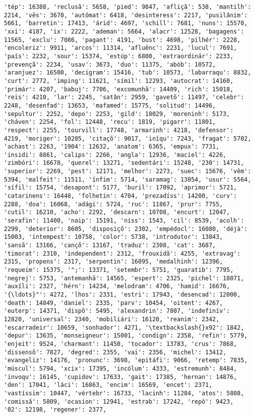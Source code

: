 \documentclass[11pt]{article}
\begin{document}
\begin{Verbatim}[commandchars=\\\{\}]
'tép': 16388, 'reclusã': 5658, 'pied': 9847, 'afliçã': 538, 'mantilh': 2214, 'vês': 3670, 'autômat': 6418, 'desinteress': 2217, 'pusilânim': 5661, 'barretin': 17413, 'árid': 4697, 'schill': 7681, 'nuns': 15570, 'xxi': 4187, 'ix': 2222, 'ademan': 5664, 'alacr': 12528, 'bagagens': 11565, 'exclu': 7086, 'pagant': 4191, 'bust': 4698, 'pilhér': 2228, 'encoleriz': 9911, 'arcos': 11314, 'afluênc': 2231, 'lucul': 7691, 'país': 2232, 'sour': 15374, 'estúp': 6800, 'extraordinár': 2233, 'prevençã': 2234, 'usav': 3673, 'duo': 11375, 'abób': 10572, 'aranjuez': 16500, 'decigram': 15416, 'tub': 10573, 'labarraqu': 8832, 'curt': 2772, 'imping': 11621, 'símil': 12293, 'autocrat': 14160, 'primár': 4207, 'babuj': 7706, 'excomunhã': 14409, 'rich': 15018, 'reis': 4210, 'lar': 2245, 'satân': 2959, 'gavetõ': 11497, 'celebr': 2248, 'desenfad': 13653, 'mafamed': 15775, 'solitud': 14496, 'sepultur': 2252, 'depo': 2253, 'gild': 18029, 'moreninh': 5173, 'cháven': 2254, 'fol': 12448, 'recu': 1819, 'pigarr': 11801, 'respect': 2255, 'tourvill': 17748, 'armarinh': 4218, 'defensor': 4219, 'moriger': 10205, 'citaçõ': 9017, 'iníqu': 7243, 'fragat': 5702, 'achast': 2263, '1904': 12632, 'anatom': 6365, 'empux': 7731, 'insidi': 8861, 'calips': 2266, 'angla': 12936, 'maciel': 4226, 'zimbóri': 16678, 'querel': 13271, 'sedentári': 15248, '230': 14731, 'superior': 2269, 'pest': 12171, 'melhor': 2273, 'suec': 15676, 'vêm': 5394, 'malfeit': 11511, 'ínfim': 5714, 'saramag': 13054, 'usur': 5564, 'sífil': 15754, 'desapont': 5177, 'buril': 17092, 'aprimor': 5721, 'catarinens': 16448, 'folhetin': 4704, 'prezadíss': 14200, 'curv': 2288, 'doa': 16068, 'adági': 5724, 'ruc': 11867, 'prur': 7755, 'cutil': 16210, 'acho': 2292, 'descarn': 10708, 'encurt': 12047, 'serafin': 11400, 'naip': 15191, 'niss': 1543, 'cil': 8539, 'acolh': 2299, 'deterior': 8605, 'disposiçõ': 2302, 'empédocl': 16080, 'déjà': 15003, 'intempest': 10758, 'color': 5738, 'introdutor': 13843, 'sansã': 13166, 'cançõ': 13167, 'traduz': 2308, 'cat': 3687, 'timorat': 2310, 'independent': 2312, 'frouxidã': 4255, 'extravag': 2315, 'propens': 2317, 'serpentin': 16095, 'medalhinh': 12396, 'requeim': 15375, '";': 13371, 'setembr': 5751, 'guaratib': 7795, 'negrej': 5753, 'antemanhã': 14565, 'espert': 2325, 'pichel': 18071, 'auxíli': 2327, 'hérn': 14234, 'melodram': 4706, 'hamid': 16676, '{\ldots}"': 4272, 'lhos': 2331, 'estri': 17943, 'desencad': 12000, 'death': 14849, 'daniel': 2335, 'parv': 10454, 'oitent': 4267, 'euterp': 14371, 'dispõ': 5495, 'alexandrin': 7807, 'indefinív': 12820, 'universal': 2340, 'mobiliári': 16120, 'reanim': 2342, 'escarradeir': 10659, 'sonhador': 4271, '\textbackslash{}x92': 1842, 'depur': 13635, 'monseigneur': 15001, 'condign': 2358, 'refin': 5779, 'enjeit': 9524, 'charmant': 11450, 'tocador': 13783, 'crus': 7868, 'dissensõ': 7827, 'degred': 2355, 'vai': 2356, 'michel': 13412, 'evangeliz': 14176, 'pronunc': 3698, 'epitáfi': 9066, 'retemp': 7835, 'múscul': 5794, 'xcix': 17395, 'incólum': 4333, 'estremunh': 8484, 'invoqu': 16145, 'cupidov': 17633, 'gait': 17385, 'hernan': 14876, 'den': 17041, 'láci': 16863, 'encim': 16569, 'encet': 2371, 'vastíssim': 10447, 'vértebr': 16733, 'lacinh': 11284, 'atos': 5808, 'comissã': 5809, 'ocasion': 12941, 'estrab': 17242, 'repô': 9423, '02': 12198, 'regener': 2377, 
\end{Verbatim}
\end{document}
